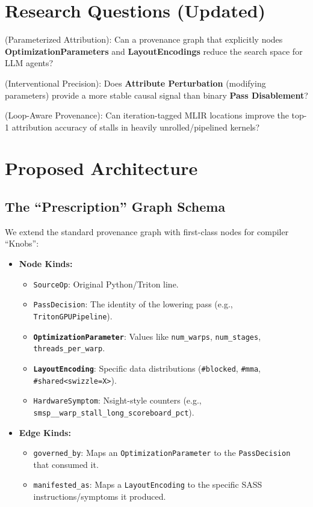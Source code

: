 \documentclass[11pt,a4paper]{article}
\begin{document}
\section{Research Questions (Updated)}
\begin{description}[style=multiline,leftmargin=3cm,font=\bfseries]
    \item[RQ1] (Parameterized Attribution): Can a provenance graph that explicitly nodes \textbf{OptimizationParameters} and \textbf{LayoutEncodings} reduce the search space for LLM agents?
    \item[RQ2] (Interventional Precision): Does \textbf{Attribute Perturbation} (modifying parameters) provide a more stable causal signal than binary \textbf{Pass Disablement}?
    \item[RQ3] (Loop-Aware Provenance): Can iteration-tagged MLIR locations improve the top-1 attribution accuracy of stalls in heavily unrolled/pipelined kernels?
\end{description}

\section{Proposed Architecture}

\subsection{The ``Prescription'' Graph Schema}
We extend the standard provenance graph with first-class nodes for compiler ``Knobs'':
\begin{itemize}
    \item \textbf{Node Kinds:} 
    \begin{itemize}
        \item \texttt{SourceOp}: Original Python/Triton line.
        \item \texttt{PassDecision}: The identity of the lowering pass (e.g., \texttt{TritonGPUPipeline}).
        \item \textbf{\texttt{OptimizationParameter}}: Values like \texttt{num\_warps}, \texttt{num\_stages}, \texttt{threads\_per\_warp}.
        \item \textbf{\texttt{LayoutEncoding}}: Specific data distributions (\texttt{\#blocked}, \texttt{\#mma}, \texttt{\#shared<swizzle=X>}).
        \item \texttt{HardwareSymptom}: Nsight-style counters (e.g., \texttt{smsp\_\_warp\_stall\_long\_scoreboard\_pct}).
    \end{itemize}
    \item \textbf{Edge Kinds:}
    \begin{itemize}
        \item \texttt{governed\_by}: Maps an \texttt{OptimizationParameter} to the \texttt{PassDecision} that consumed it.
        \item \texttt{manifested\_as}: Maps a \texttt{LayoutEncoding} to the specific SASS instructions/symptoms it produced.
    \end{itemize}
\end{itemize}
\end{document}
